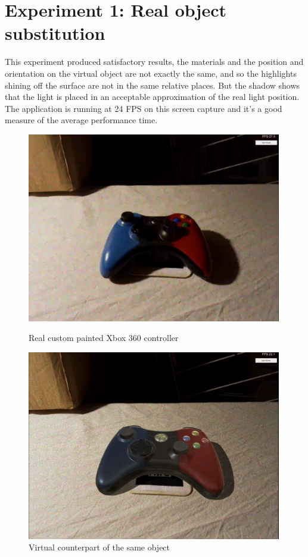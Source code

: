 \section{Experiment 1: Real object substitution}

This experiment produced satisfactory results, the materials and the position and orientation on the virtual object are not exactly the same, and so the highlights shining off the surface are not in the same relative places. But the shadow shows that the light is placed in an acceptable approximation of the real light position. The application is running at 24 FPS on this screen capture and it's a good measure of the average performance time. 
\begin{figure}[H]
    \centering
    \begin{minipage}{0.475\textwidth}
        \centering
        \includegraphics[width=0.99\textwidth]{Figures/ContReal.png} %
        \caption{Real custom painted Xbox 360 controller}
    \end{minipage}\hfill
    \begin{minipage}{0.475\textwidth}
        \centering
        \includegraphics[width=0.99\textwidth]{Figures/ContVirtual.png} %
        \caption{Virtual counterpart of the same object}
    \end{minipage}
\end{figure}

